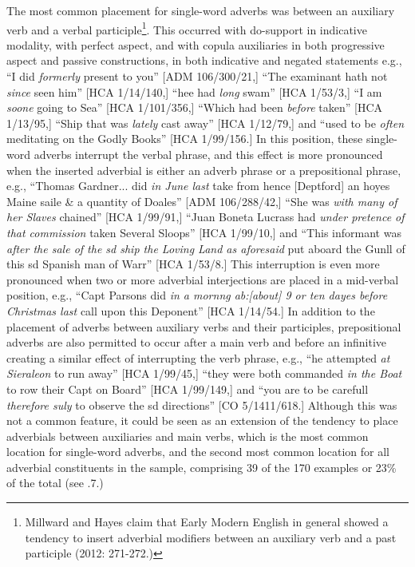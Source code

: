 The most common placement for single-word adverbs was between an auxiliary verb and a verbal participle\footnote{Millward and Hayes claim that Early Modern English in general showed a tendency to insert adverbial modifiers between an auxiliary verb and a past participle (2012: 271-272.)}. This occurred with do-support in indicative modality, with perfect aspect, and with copula auxiliaries in both progressive aspect and passive constructions, in both indicative and negated statements e.g., “I did \textit{formerly} present to you” [ADM 106/300/21,] “The examinant hath not \textit{since} seen him” [HCA 1/14/140,] “hee had \textit{long} swam” [HCA 1/53/3,] “I am \textit{soone} going to Sea” [HCA 1/101/356,] “Which had been \textit{before} taken” [HCA 1/13/95,] “Ship that was \textit{lately} cast away” [HCA 1/12/79,] and “used to be \textit{often} meditating on the Godly Books” [HCA 1/99/156.] In this position, these single-word adverbs interrupt the verbal phrase, and this effect is more pronounced when the inserted adverbial is either an adverb phrase or a prepositional phrase, e.g., “Thomas Gardner... did \textit{in June last} take from hence [Deptford] an hoyes Maine saile \& a quantity of Doales” [ADM 106/288/42,] “She was \textit{with many of her Slaves} chained” [HCA 1/99/91,]  “Juan Boneta Lucrass had \textit{under pretence of that commission} taken Several Sloops” [HCA 1/99/10,] and “This informant was \textit{after the sale of the sd ship the Loving Land as aforesaid} put aboard the Gunll of this sd Spanish man of Warr” [HCA 1/53/8.] This interruption is even more pronounced when two or more adverbial interjections are placed in a mid-verbal position, e.g., “Capt Parsons did \textit{in a mornng ab:[about] 9 or ten dayes before Christmas last} call upon this Deponent” [HCA 1/14/54.] In addition to the placement of adverbs between auxiliary verbs and their participles, prepositional adverbs are also permitted to occur after a main verb and before an infinitive creating a similar effect of interrupting the verb phrase, e.g., “he attempted \textit{at Sieraleon} to run away” [HCA 1/99/45,] “they were both commanded \textit{in the Boat} to row their Capt on Board”  [HCA 1/99/149,] and “you are to be carefull \textit{therefore suly} to observe the sd directions” [CO 5/1411/618.] Although this was not a common feature, it could be seen as an extension of the tendency to place adverbials between auxiliaries and main verbs, which is the most common location for single-word adverbs, and the second most common location for all adverbial constituents in the sample, comprising 39 of the 170 examples or 23\% of the total (see .7.)

